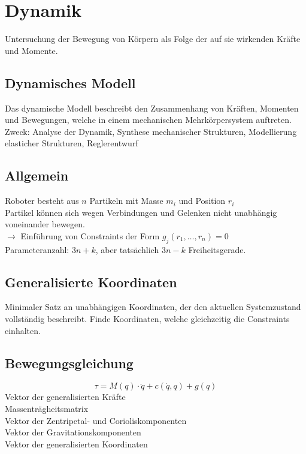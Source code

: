 

\section{Dynamik}%
\label{dyn:sec:dynamik}
Untersuchung der Bewegung von Körpern als Folge der auf sie wirkenden Kräfte und Momente.

\subsection{Dynamisches Modell}%
\label{dyn:sub:dynamisches-modell}
Das dynamische Modell beschreibt den Zusammenhang von Kräften, Momenten und Bewegungen, welche in einem mechanischen
Mehrkörpersystem auftreten.\\

Zweck: Analyse der Dynamik, Synthese mechanischer Strukturen, Modellierung elasticher Strukturen, Reglerentwurf

\subsection{Allgemein}%
\label{dyn:sub:allgemein}
Roboter besteht aus \(n\) Partikeln mit Masse \(m_i\) und Position \(r_i\)\\
Partikel können sich wegen Verbindungen und Gelenken nicht unabhängig voneinander bewegen.\\
\(\rightarrow\) Einführung von Constraints der Form \(g_j(r_1, \ldots, r_n) = 0\)\\

Parameteranzahl: \(3n + k\), aber tatsächlich \(3n-k\) Freiheitsgerade.

\subsection{Generalisierte Koordinaten}%
\label{dyn:sub:generalisierte-koordinaten}
Minimaler Satz an unabhängigen Koordinaten, der den aktuellen Systemzustand vollständig beschreibt.
Finde Koordinaten, welche gleichzeitig die Constraints einhalten.

\subsection{Bewegungsgleichung}%
\label{dyn:sub:bewegungsgleichung}
\[\tau = M(q) \cdot \ddot{q} + c(\dot{q}, q) + g(q)\]
 Vektor der generalisierten Kräfte\\
 Massenträgheitsmatrix\\
 Vektor der Zentripetal- und Corioliskomponenten\\
 Vektor der Gravitationskomponenten\\
 Vektor der generalisierten Koordinaten

